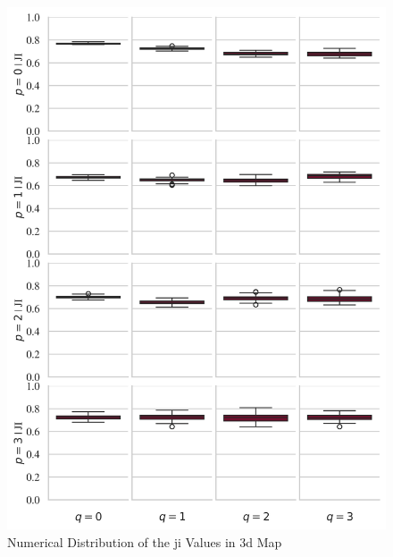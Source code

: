 \begin{figure}[htbp!]
\centering
\includegraphics{images/ji3D.png}
\caption{Numerical Distribution of the \gls{ji} Values in \gls{3d} Map}
\label{fig:ji3D}
\end{figure}